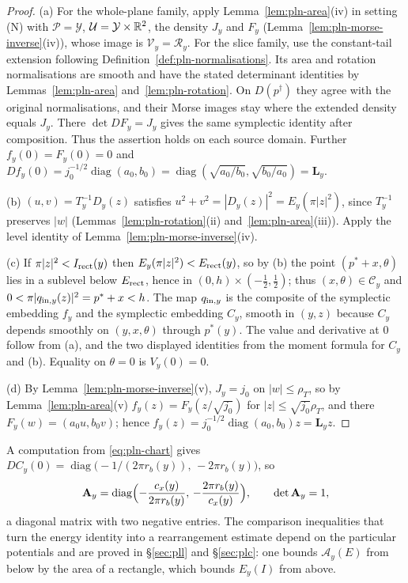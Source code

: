 \begin{proof}
(a) For the whole-plane family, apply Lemma~\ref{lem:pln-area}(iv) in setting (N) with
$\mathcal P=\mathcal Y$, $\mathcal U=\mathcal Y\times\mathbb{R}^2$, the density $J_y$ and $F_y$
(Lemma~\ref{lem:pln-morse-inverse}(iv)), whose image is $\mathcal V_y=\mathcal R_y$.
For the slice family, use the constant-tail extension following
Definition~\ref{def:pln-normalisations}. Its area and rotation normalisations are smooth and have the
stated determinant identities by Lemmas~\ref{lem:pln-area} and~\ref{lem:pln-rotation}.
On $D(p^\dagger)$ they agree with the original normalisations, and their Morse images stay where the
extended density equals $J_y$. There $\det DF_y=J_y$ gives the same symplectic identity after composition.
Thus the assertion holds on each source domain. Further $f_y(0)=F_y(0)=0$
and $Df_y(0)=j_0^{-1/2}\operatorname{diag}(a_0,b_0)=\operatorname{diag}(\sqrt{a_0/b_0},\sqrt{b_0/a_0})=\mathbf L_y$.

(b) $(u,v)=T_y^{-1}D_y(z)$ satisfies $u^2+v^2=|D_y(z)|^2=E_y(\pi|z|^2)$, since $T_y^{-1}$ preserves $|w|$
(Lemmas~\ref{lem:pln-rotation}(ii) and~\ref{lem:pln-area}(iii)). Apply the level identity of
Lemma~\ref{lem:pln-morse-inverse}(iv).

(c) If $\pi|z|^2<I_{\rm rect}(y)$ then $E_y(\pi|z|^2)<E_{\rm rect}(y)$, so by (b) the point
$(p^*+x,\theta)$ lies in a sublevel below $E_{\rm rect}$, hence in $(0,h)\times(-\frac12,\frac12)$; thus
$(x,\theta)\in\mathcal C_y$ and $0<\pi|q_{{\rm in},y}(z)|^2=p^*+x<h$. The map $q_{{\rm in},y}$ is the composite of the
symplectic embedding $f_y$ and the symplectic embedding $C_y$, smooth in $(y,z)$ because $C_y$ depends smoothly on
$(y,x,\theta)$ through $p^*(y)$. The value and derivative at $0$ follow from (a), and the two displayed identities
from the moment formula for $C_y$ and (b). Equality on $\theta=0$ is $V_y(0)=0$.

(d) By Lemma~\ref{lem:pln-morse-inverse}(v), $J_y=j_0$ on $|w|\le\rho_T$, so by Lemma~\ref{lem:pln-area}(v)
$f_y(z)=F_y(z/\sqrt{j_0})$ for $|z|\le\sqrt{j_0}\rho_T$, and there $F_y(w)=(a_0u,b_0v)$; hence
$f_y(z)=j_0^{-1/2}\operatorname{diag}(a_0,b_0)z=\mathbf L_yz$.
\end{proof}

A computation from \eqref{eq:pln-chart} gives
$DC_y(0)=\operatorname{diag}\bigl(-1/(2\pi r_b(y)),\,-2\pi r_b(y)\bigr)$, so
\begin{equation}\label{eq:pln-A0}
 \mathbf A_y=\operatorname{diag}\Bigl(-\frac{c_x(y)}{2\pi r_b(y)},\,-\frac{2\pi r_b(y)}{c_x(y)}\Bigr),\qquad\det\mathbf A_y=1,
\end{equation}
a diagonal matrix with two negative entries. The comparison inequalities that turn the energy identity into a
rearrangement estimate depend on the particular potentials and are proved in \S\ref{sec:pll} and
\S\ref{sec:plc}: one bounds $\mathcal A_y(E)$ from below by the area of a rectangle, which bounds $E_y(I)$ from above.

